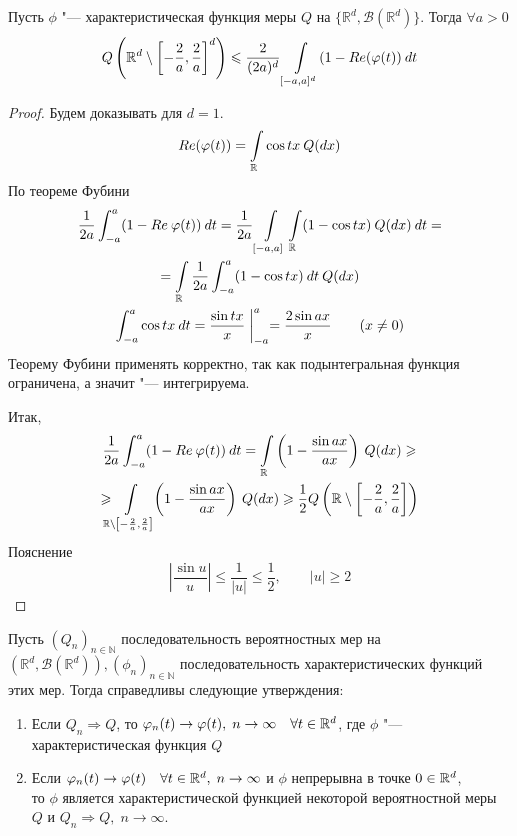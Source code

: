     \begin{lemma} \label{lect12:lem5}
        Пусть $\phi$ "--- характеристическая функция меры $Q$ на $\{\mathbb{R}^d, \mathcal{B}(\mathbb{R}^d)\}$. Тогда $\forall a > 0$
        $$Q\left(\mathbb{R}^d \setminus \left[-\frac{2}{a}, \frac{2}{a}\right]^d\right) \leqslant \frac{2}{(2a)^d} \int\limits_{[-a, a]^d} (1 - Re(\varphi(t)) \:dt$$
    \end{lemma}
    \begin{proof}
        Будем доказывать для $d = 1$.
        $$Re(\varphi(t)) = \int\limits_{\mathbb{R}} \cos{tx}\:Q(dx)$$
        По теореме Фубини
        \begin{gather*}
            \frac{1}{2a} \int_{-a}^a (1 - Re\: \varphi(t))\:dt = \frac{1}{2a} \int\limits_{[-a, a]} \int\limits_{\mathbb{R}} (1 - \cos{tx}) \:Q(dx) \:dt
            =\\= \int\limits_{\mathbb{R}} \frac{1}{2a} \int_{-a}^a (1 - \cos{tx})\: dt \:Q(dx)\\
            \int_{-a}^a \cos{tx} \:dt = \frac{\sin{tx}}{x} \biggm|_{-a}^a = \frac{2\sin{ax}}{x} \qquad (x \ne 0)
        \end{gather*}
        Теорему Фубини применять корректно, так как подынтегральная функция ограничена, а значит "--- интегрируема.

        Итак,
        \begin{multline*}
            \frac{1}{2a} \int_{-a}^a (1 - Re\:\varphi(t))\: dt = \int\limits_{\mathbb{R}} \left(1 - \frac{\sin{ax}}{ax}\right) \:Q(dx) \geqslant\\\geqslant \!\!\!\!\int\limits_{\mathbb{R} \setminus \left[-\frac{2}{a}, \frac{2}{a}  \right]}\!\! \left(1 - \frac{\sin{ax}}{ax} \right)\:Q(dx) \geqslant \frac{1}{2} Q\left(\mathbb{R}\setminus\left[ -\frac{2}{a}, \frac{2}{a}\right]\right) 
        \end{multline*}
        Пояснение
        $$\left| \frac{\sin{u}}{u}\right| \leqslant \frac{1}{|u|} \leqslant \frac{1}{2}, \qquad |u| \geqslant2 $$
    \end{proof}
\begin{theorem} \label{lect12:th5}
    Пусть $(Q_n)_{n \in \mathbb{N}}$ последовательность вероятностных мер на $(\mathbb{R}^d, \mathcal{B}(\mathbb{R}^d)), (\phi_n)_{n\in \mathbb{N}}$ последовательность характеристических функций этих мер. Тогда справедливы следующие утверждения:
    \begin{enumerate}
        \item Если $Q_n \Rightarrow Q$, то $\varphi_n(t) \to \varphi(t), \;  n \to \infty \quad \forall t \in \mathbb{R}^d$, где $\phi$ "--- характеристическая функция $Q$
        \item Если $\varphi_n(t) \to \varphi(t) \quad \forall t \in \mathbb{R}^d, \; n \to \infty$  и $\phi$ непрерывна в точке $0\in\mathbb{R}^d$,\\то $\phi$ является характеристической функцией некоторой вероятностной меры $Q$ и $Q_n \Rightarrow Q, \; n \to \infty$.
    \end{enumerate}
\end{theorem}
